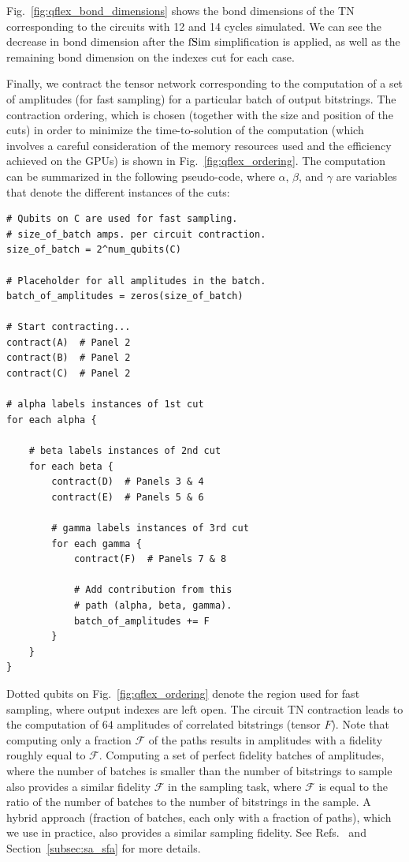 Fig.~\ref{fig:qflex_bond_dimensions} shows the bond dimensions of the TN corresponding to the circuits with 12 and 14 cycles simulated. We can see the decrease in bond dimension after the ${\rm fSim}$ simplification is applied, as well as the remaining bond dimension on the indexes cut for each case.

Finally, we contract the tensor network corresponding to the computation of a set of amplitudes (for fast sampling) for a particular batch of output bitstrings. The contraction ordering, which is chosen (together with the size and position of the cuts) in order to minimize the time-to-solution of the computation (which involves a careful consideration of the memory resources used and the efficiency achieved on the GPUs) is shown in Fig.~\ref{fig:qflex_ordering}. The computation can be summarized in the following pseudo-code, where $\alpha$, $\beta$, and $\gamma$ are variables that denote the different instances of the cuts:
\begin{verbatim}
# Qubits on C are used for fast sampling.
# size_of_batch amps. per circuit contraction.
size_of_batch = 2^num_qubits(C)

# Placeholder for all amplitudes in the batch.
batch_of_amplitudes = zeros(size_of_batch)

# Start contracting...
contract(A)  # Panel 2
contract(B)  # Panel 2
contract(C)  # Panel 2

# alpha labels instances of 1st cut
for each alpha {

    # beta labels instances of 2nd cut
    for each beta {
        contract(D)  # Panels 3 & 4
        contract(E)  # Panels 5 & 6
        
        # gamma labels instances of 3rd cut
        for each gamma {
            contract(F)  # Panels 7 & 8
            
            # Add contribution from this
            # path (alpha, beta, gamma).
            batch_of_amplitudes += F
        }
    }
}
\end{verbatim}
Dotted qubits on Fig.~\ref{fig:qflex_ordering} denote the region used for fast sampling, where output indexes are left open. The circuit TN contraction leads to the computation of $64$ amplitudes of correlated bitstrings (tensor $F$). Note that computing only a fraction $\mathcal{F}$ of the paths results in amplitudes with a fidelity roughly equal to $\mathcal{F}$. Computing a set of perfect fidelity batches of amplitudes, where the number of batches is smaller than the number of bitstrings to sample also provides a similar fidelity $\mathcal{F}$ in the sampling task, where $\mathcal{F}$ is equal to the ratio of the number of batches to the number of bitstrings in the sample. A hybrid approach (fraction of batches, each only with a fraction of paths), which we use in practice, also provides a similar sampling fidelity. See Refs.~\cite{markov_quantum_2018, villalonga2019flexible} and Section~\ref{subsec:sa_sfa} for more details.

